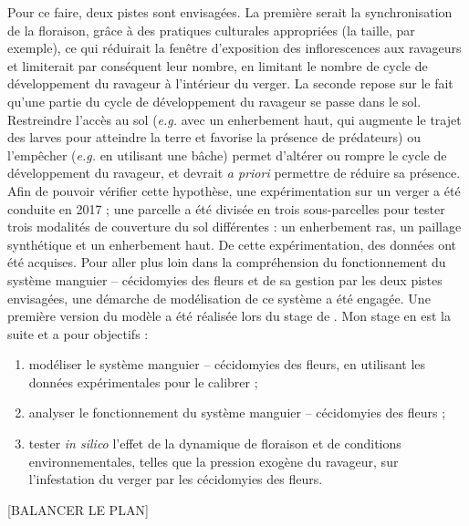 
Pour ce faire, deux pistes sont envisagées.
La première serait la synchronisation de la floraison, grâce à des pratiques culturales appropriées (la taille, par exemple), ce qui réduirait la fenêtre d'exposition des inflorescences aux ravageurs et limiterait par conséquent leur nombre, en limitant le nombre de cycle de développement du ravageur à l'intérieur du verger.
La seconde repose sur le fait qu'une partie du cycle de développement du ravageur se passe dans le sol.
Restreindre l'accès au sol (\emph{e.g.} avec un enherbement haut, qui augmente le trajet des larves pour atteindre la terre et favorise la présence de prédateurs) ou l'empêcher (\emph{e.g.} en utilisant une bâche) permet d'altérer ou rompre le cycle de développement du ravageur, et devrait \emph{a priori} permettre de réduire sa présence. 
Afin de pouvoir vérifier cette hypothèse, une expérimentation sur un verger a été conduite en 2017 ; une parcelle a été divisée en trois sous-parcelles pour tester trois modalités de couverture du sol différentes : un enherbement ras, un paillage synthétique et un enherbement haut. 
De cette expérimentation, des données ont été acquises.
Pour aller plus loin dans la compréhension du fonctionnement du système manguier -- cécidomyies des fleurs et de sa gestion par les deux pistes envisagées, une démarche de modélisation de ce système a été engagée.
Une première version du modèle a été réalisée lors du stage de \citet{laurie}.
Mon stage en est la suite et a pour objectifs :
\begin{enumerate}
 \item modéliser le système manguier -- cécidomyies des fleurs, en utilisant les données expérimentales pour le calibrer ;
 \item analyser le fonctionnement du système manguier -- cécidomyies des fleurs ;
 \item tester \emph{in silico} l'effet de la dynamique de floraison et de conditions environnementales, telles que la pression exogène du ravageur, sur l'infestation du verger par les cécidomyies des fleurs.
\end{enumerate}




[BALANCER LE PLAN]
